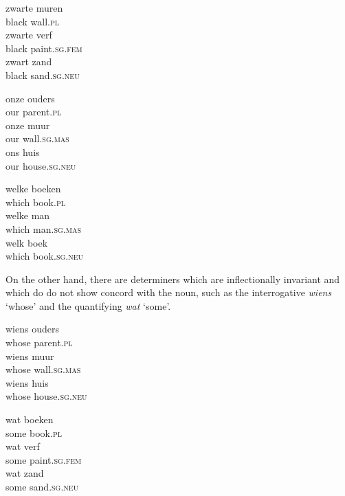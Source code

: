 \documentclass[output=paper
                ,modfonts
                ,nonflat
	        ,collection
	        ,collectionchapter
	        ,collectiontoclongg
 	        ,biblatex
                ,babelshorthands
                ,newtxmath
                ,draftmode
                ,colorlinks, citecolor=brown
]{./langsci/langscibook}
\begin{document}
\begin{exe} 
\ex\label{wit} 
\begin{xlist}
\ex
\gll  zwarte muren      \\
      black wall.\textsc{pl} \\
\ex
\gll  zwarte verf \\
      black paint.\textsc{sg.fem} \\
\ex
\gll  zwart zand \\
      black sand.\textsc{sg.neu} \\
\end{xlist}
\ex\label{ons}
\begin{xlist}
\ex
\gll onze ouders     \\
     our parent.\textsc{pl}  \\
\ex
\gll onze muur     \\
     our wall.\textsc{sg.mas}  \\
\ex
\gll ons huis     \\
     our house.\textsc{sg.neu}  \\
\end{xlist}
\ex\label{welk}
\begin{xlist} 
\ex
\gll welke boeken  \\
     which book.\textsc{pl} \\
\ex
\gll welke man                 \\
     which man.\textsc{sg.mas}  \\
\ex
\gll welk boek   \\
     which book.\textsc{sg.neu} \\
\end{xlist}
\end{exe} 

\noindent
On the other hand, there are determiners which are inflectionally invariant and which do 
do not show concord with the noun, such as the interrogative \emph{wiens} `whose' 
and the quantifying \emph{wat} `some'. 

\begin{exe} 
\ex\label{wiens}
\begin{xlist} 
\ex
\gll  wiens ouders \\ 
      whose parent.\textsc{pl} \\
\ex
\gll  wiens muur \\ 
      whose wall.\textsc{sg.mas} \\
\ex
\gll  wiens huis \\ 
      whose house.\textsc{sg.neu} \\
\end{xlist}
\ex\label{wat}
\begin{xlist}
\ex
\gll  wat boeken  \\
      some book.\textsc{pl} \\
\ex
\gll  wat verf                  \\
      some paint.\textsc{sg.fem} \\
\ex
\gll  wat zand  \\
      some sand.\textsc{sg.neu} \\
\end{xlist} 
\end{exe} 
\end{document}
